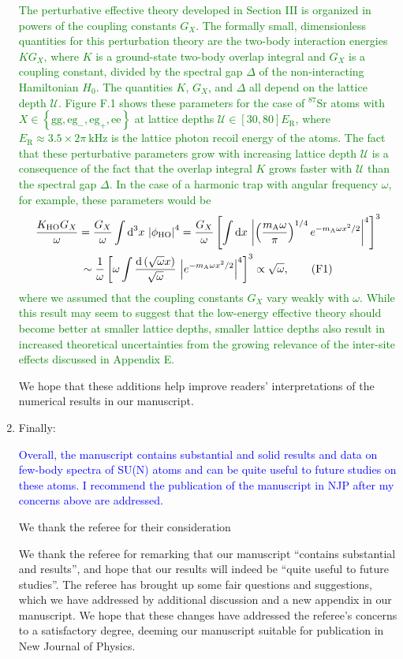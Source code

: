 \documentclass[preprint,showkeys,nofootinbib]{revtex4-1}
\renewcommand{\t}{\text} %
\newcommand{\f}{\dfrac} %
\newcommand{\p}[1]{\left(#1\right)} %
\renewcommand{\sp}[1]{\left[#1\right]} %
\renewcommand{\set}[1]{\left\{#1\right\}} %
\renewcommand{\d}{\text{d}}
\newcommand{\g}{\text{g}}
\newcommand{\e}{\text{e}}
\newcommand{\U}{\mathcal{U}}
\newcommand{\1}{\mathds{1}}
\newcommand{\mA}{m_{\text{A}}} %
\newcommand{\blue}[1]{\textcolor{blue}{#1}}
\newcommand{\green}[1]{\textcolor{green}{#1}}
\begin{document}
\begin{enumerate}
  \green{The perturbative effective theory developed in Section III is
    organized in powers of the coupling constants $G_X$.  The formally
    small, dimensionless quantities for this perturbation theory are
    the two-body interaction energies $K G_X$, where $K$ is a
    ground-state two-body overlap integral and $G_X$ is a coupling
    constant, divided by the spectral gap $\Delta$ of the
    non-interacting Hamiltonian $H_0$.  The quantities $K$, $G_X$, and
    $\Delta$ all depend on the lattice depth $\U$.  Figure F.1 shows
    these parameters for the case of ${}^{87}$Sr atoms with
    $X\in\set{\g\g, \e\g_-, \e\g_+, \e\e}$ at lattice depths
    $\U\in\sp{30,80}E_{\t{R}}$, where
    $E_{\t{R}}\approx3.5\times2\pi~\t{kHz}$ is the lattice photon
    recoil energy of the atoms.  The fact that these perturbative
    parameters grow with increasing lattice depth $\U$ is a
    consequence of the fact that the overlap integral $K$ grows faster
    with $\U$ than the spectral gap $\Delta$.  In the case of a
    harmonic trap with angular frequency $\omega$, for example, these
    parameters would be
    \begin{multline*}
      \f{K_{\t{HO}} G_X}{\omega}
      = \f{G_X}{\omega} \int \d^3 x~\abs{\phi_{\t{HO}}}^4
      = \f{G_X}{\omega} \sp{\int \d x~
        \abs{\p{\f{\mA\omega}{\pi}}^{1/4} e^{-\mA\omega x^2/2}}^4}^3 \\
      \sim \f1{\omega}
      \sp{\omega \int\f{\d\p{\sqrt\omega x}}{\sqrt\omega}
        ~\abs{e^{-\mA\omega x^2/2}}^4}^3
      \propto \sqrt{\omega},
      \tag{F1}
    \end{multline*}
    where we assumed that the coupling constants $G_X$ vary weakly
    with $\omega$.  While this result may seem to suggest that the
    low-energy effective theory should become better at smaller
    lattice depths, smaller lattice depths also result in increased
    theoretical uncertainties from the growing relevance of the
    inter-site effects discussed in Appendix E.}

  We hope that these additions help improve readers' interpretations
  of the numerical results in our manuscript.


\item Finally:

  \blue{Overall, the manuscript contains substantial and solid results
    and data on few-body spectra of SU(N) atoms and can be quite
    useful to future studies on these atoms. I recommend the
    publication of the manuscript in NJP after my concerns above are
    addressed.}

  We thank the referee for their consideration

  We thank the referee for remarking that our manuscript ``contains
  substantial and results'', and hope that our results will indeed be
  ``quite useful to future studies''.  The referee has brought up some
  fair questions and suggestions, which we have addressed by
  additional discussion and a new appendix in our manuscript.  We hope
  that these changes have addressed the referee's concerns to a
  satisfactory degree, deeming our manuscript suitable for publication
  in New Journal of Physics.

\end{enumerate}
\end{document}
